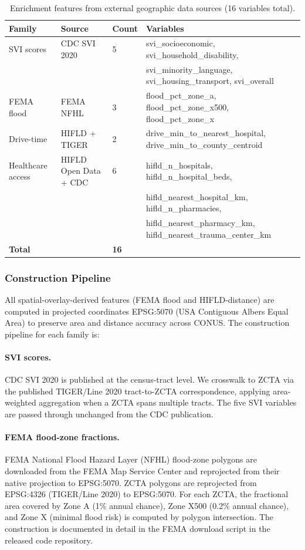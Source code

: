 \documentclass{article}
\begin{document}
\begin{table}[htbp]
\centering
\small
\caption{Enrichment features from external geographic data sources (16 variables total).}
\label{tab:enrichment_features}
\begin{tabular}{llll}
\toprule
\textbf{Family} & \textbf{Source} & \textbf{Count} & \textbf{Variables} \\
\midrule
SVI scores & CDC SVI 2020 & 5 & svi\_socioeconomic, svi\_household\_disability, \\
& & & svi\_minority\_language, svi\_housing\_transport, svi\_overall \\
FEMA flood & FEMA NFHL & 3 & flood\_pct\_zone\_a, flood\_pct\_zone\_x500, flood\_pct\_zone\_x \\
Drive-time & HIFLD + TIGER & 2 & drive\_min\_to\_nearest\_hospital, drive\_min\_to\_county\_centroid \\
Healthcare access & HIFLD Open Data + CDC & 6 & hifld\_n\_hospitals, hifld\_n\_hospital\_beds, \\
& & & hifld\_nearest\_hospital\_km, hifld\_n\_pharmacies, \\
& & & hifld\_nearest\_pharmacy\_km, hifld\_nearest\_trauma\_center\_km \\
\midrule
\textbf{Total} & & \textbf{16} & \\
\bottomrule
\end{tabular}
\end{table}

\subsubsection{Construction Pipeline}

All spatial-overlay-derived features (FEMA flood and HIFLD-distance) are computed in projected coordinates EPSG:5070 (USA Contiguous Albers Equal Area) to preserve area and distance accuracy across CONUS. The construction pipeline for each family is:

\paragraph{SVI scores.} CDC SVI 2020 is published at the census-tract level. We crosswalk to ZCTA via the published TIGER/Line 2020 tract-to-ZCTA correspondence, applying area-weighted aggregation when a ZCTA spans multiple tracts. The five SVI variables are passed through unchanged from the CDC publication.

\paragraph{FEMA flood-zone fractions.} FEMA National Flood Hazard Layer (NFHL) flood-zone polygons are downloaded from the FEMA Map Service Center and reprojected from their native projection to EPSG:5070. ZCTA polygons are reprojected from EPSG:4326 (TIGER/Line 2020) to EPSG:5070. For each ZCTA, the fractional area covered by Zone A (1\% annual chance), Zone X500 (0.2\% annual chance), and Zone X (minimal flood risk) is computed by polygon intersection. The construction is documented in detail in the FEMA download script in the released code repository.
\end{document}
